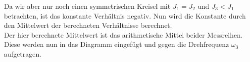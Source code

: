 Da wir aber nur noch einen symmetrischen Kreisel mit $J_1 = J_2$ und $J_3<J_1$ betrachten, ist das konstante Verh\"altnis  negativ. Nun wird die Konstante durch den Mittelwert der berechneten Verh\"altnisse berechnet.
\begin{equation}
\end{equation}
Der hier berechnete Mittelwert ist das arithmetische Mittel beider Messreihen. Diese werden nun in das Diagramm eingef\"ugt und gegen die Drehfrequenz $\omega_3$ aufgetragen. 